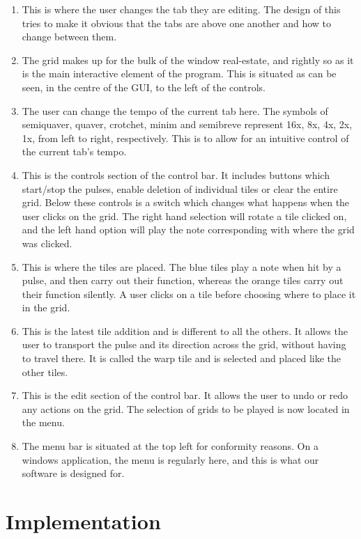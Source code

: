 \documentclass[10pt,a4paper]{article}
\begin{document}
\begin{enumerate}
\item This is where the user changes the tab they are editing. The design of this tries to make it obvious that the tabs are above one another and how to change between them.
\item  The grid makes up for the bulk of the window real-estate, and rightly so as it is the main interactive element of the program. This is situated as can be seen, in the centre of the GUI, to the left of the controls.
\item  The user can change the tempo of the current tab here. The symbols of semiquaver, quaver, crotchet, minim and semibreve represent 16x, 8x, 4x, 2x, 1x, from left to right, respectively. This is to allow for an intuitive control of the current tab's tempo.
\item  This is the controls section of the control bar. It includes buttons which start/stop the pulses, enable deletion of individual tiles or clear the entire grid. Below these controls is a switch which changes what happens when the user clicks on the grid. The right hand selection will rotate a tile clicked on, and the left hand option will play the note corresponding with where the grid was clicked.
\item  This is where the tiles are placed. The blue tiles play a note when hit by a pulse, and then carry out their function, whereas the orange tiles carry out their function silently. A user clicks on a tile before choosing where to place it in the grid.
\item  This is the latest tile addition and is different to all the others. It allows the user to transport the pulse and its direction across the grid, without having to travel there. It is called the warp tile and is selected and placed like the other tiles.
\item  This is the edit section of the control bar. It allows the user to undo or redo any actions on the grid. The selection of grids to be played is now located in the menu.
\item  The menu bar is situated at the top left for conformity reasons. On a windows application, the menu is regularly here, and this is what our software is designed for.
\end{enumerate}

\part{Implementation}
\end{document}
